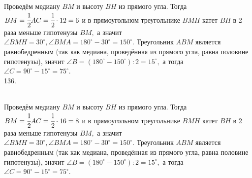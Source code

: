 \documentclass[12pt]{article}
\begin{document}
Проведём медиану $BM$ и высоту $BH$ из прямого угла. Тогда $BM=\cfrac{1}{2}AC=\cfrac{1}{2}\cdot12=6$ и в прямоугольном треугольнике $BMH$ катет $BH$ в 2 раза меньше гипотенузы $BM,$ а значит $\angle BMH=30^\circ, \angle BMA=180^\circ-30^\circ=150^\circ.$ Треугольник $ABM$ является равнобедренным (так как медиана, проведённая из прямого угла, равна половине гипотенузы), значит $\angle B=(180^\circ-150^\circ):2=15^\circ,$ а тогда $\angle C=90^\circ-15^\circ=75^\circ.$\\
136. \begin{figure}[ht!]
\end{figure}\\
Проведём медиану $BM$ и высоту $BH$ из прямого угла. Тогда $BM=\cfrac{1}{2}AC=\cfrac{1}{2}\cdot16=8$ и в прямоугольном треугольнике $BMH$ катет $BH$ в 2 раза меньше гипотенузы $BM,$ а значит $\angle BMH=30^\circ, \angle BMA=180^\circ-30^\circ=150^\circ.$ Треугольник $ABM$ является равнобедренным (так как медиана, проведённая из прямого угла, равна половине гипотенузы), значит $\angle B=(180^\circ-150^\circ):2=15^\circ,$ а тогда $\angle C=90^\circ-15^\circ=75^\circ.$\\
\end{document}
